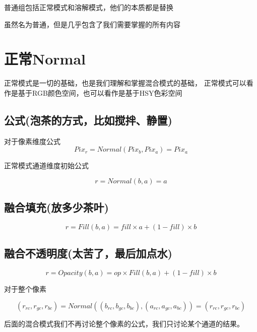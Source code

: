 \begin{introduction}
	\item 普通组包括正常模式和溶解模式，他们的本质都是替换
	\item 虽然名为普通，但是几乎包含了我们需要掌握的所有内容
\end{introduction}
\section{ 正常Normal}
正常模式是一切的基础，也是我们理解和掌握混合模式的基础，
正常模式可以看作是基于RGB颜色空间，也可以看作是基于HSY色彩空间

\subsection{ 公式(泡茶的方式，比如搅拌、静置)}

对于像素维度公式
\begin{equation}
	Pix_r=Normal(Pix_b,Pix_a)=Pix_a
\end{equation}

正常模式通道维度初始公式

\begin{equation}r=Normal(b,a)=a\end{equation}

\subsection{ 融合填充(放多少茶叶)}


\begin{equation}r=Fill(b,a)= fill\times a + (1-fill)\times b\end{equation}

\subsection{ 融合不透明度(太苦了，最后加点水)}

\begin{equation}r=Opacity(b,a)= op\times Fill(b,a) + (1-fill)\times b\end{equation}

对于整个像素

\begin{equation}(r_{rc},r_{gc},r_{bc})=Normal((b_{rc},b_{gc},b_{bc}),(a_{rc},a_{gc},a_{bc}))=(r_{rc},r_{gc},r_{bc})\end{equation}

后面的混合模式我们不再讨论整个像素的公式，我们只讨论某个通道的结果。

